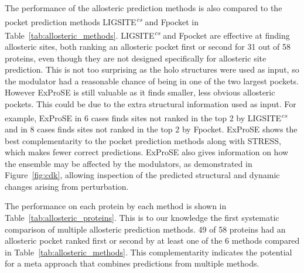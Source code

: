 The performance of the allosteric prediction methods is also compared to the pocket prediction methods LIGSITE\textsuperscript{\it cs} and Fpocket \cite{LeGuilloux2009} in Table~\ref{tab:allosteric_methods}.
LIGSITE\textsuperscript{\it cs} and Fpocket are effective at finding allosteric sites, both ranking an allosteric pocket first or second for 31 out of 58 proteins, even though they are not designed specifically for allosteric site prediction.
This is not too surprising as the holo structures were used as input, so the modulator had a reasonable chance of being in one of the two largest pockets.
However ExProSE is still valuable as it finds smaller, less obvious allosteric pockets.
This could be due to the extra structural information used as input.
For example, ExProSE in 6 cases finds sites not ranked in the top 2 by LIGSITE\textsuperscript{\it cs} and in 8 cases finds sites not ranked in the top 2 by Fpocket.
ExProSE shows the best complementarity to the pocket prediction methods along with STRESS, which makes fewer correct predictions.
ExProSE also gives information on how the ensemble may be affected by the modulators, as demonstrated in Figure~\ref{fig:cdk}, allowing inspection of the predicted structural and dynamic changes arising from perturbation.

The performance on each protein by each method is shown in Table~\ref{tab:allosteric_proteins}.
This is to our knowledge the first systematic comparison of multiple allosteric prediction methods.
49 of 58 proteins had an allosteric pocket ranked first or second by at least one of the 6 methods compared in Table~\ref{tab:allosteric_methods}.
This complementarity indicates the potential for a meta approach that combines predictions from multiple methods.



